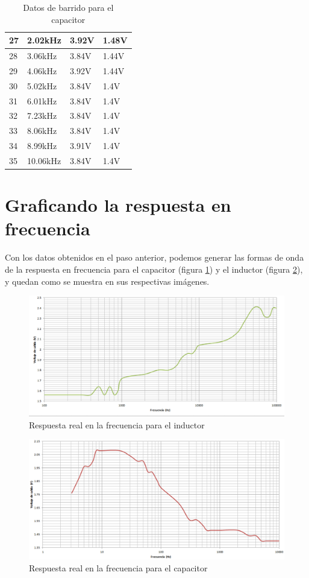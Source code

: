 \documentclass[letterpaper,spanish,12pt]{report}
\begin{document}
\begin{table}[h]
\begin{tabular}{|l|l|l|l|}
			27 & 2.02kHz & 3.92V & 1.48V \\
			\hline
			28 & 3.06kHz & 3.84V & 1.44V \\
			\hline
			29 & 4.06kHz & 3.92V & 1.44V \\
			\hline
			30 & 5.02kHz & 3.84V & 1.4V \\
			\hline
			31 & 6.01kHz & 3.84V & 1.4V \\
			\hline
			32 & 7.23kHz & 3.84V & 1.4V \\
			\hline
			33 & 8.06kHz & 3.84V & 1.4V \\
			\hline
			34 & 8.99kHz & 3.91V & 1.4V \\
			\hline
			35 & 10.06kHz & 3.84V & 1.4V \\
			\hline
		\end{tabular}
	\caption{Datos de barrido para el capacitor}
	\label{tab:2}
\end{table}

	\section{Graficando la respuesta en frecuencia}

Con los datos obtenidos en el paso anterior, podemos generar las formas de onda de la respuesta en frecuencia para el capacitor (figura \ref{cir:14}) y el inductor (figura \ref{cir:15}), y quedan como se muestra en sus respectivas im\'agenes.

\begin{figure}[h]
	\centering
		\includegraphics[width=1.00\textwidth]{ResReaFreL.eps}
	\caption{Respuesta real en la frecuencia para el inductor}
	\label{cir:14}
\end{figure}

\begin{figure}[h]
	\centering
		\includegraphics[width=1.00\textwidth]{ResReaFreC.eps}
	\caption{Respuesta real en la frecuencia para el capacitor}
	\label{cir:15}
\end{figure}
\end{document}
